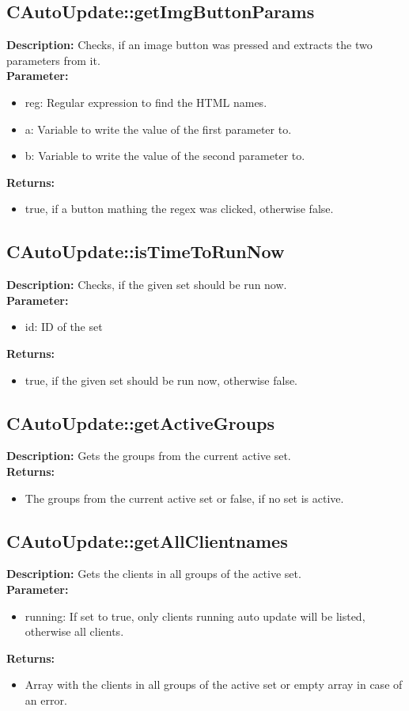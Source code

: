 \subsection{CAutoUpdate::getImgButtonParams}
\textbf{Description:} Checks, if an image button was pressed and extracts the two parameters from it.\\
\textbf{Parameter:}
\begin{itemize}
\item reg: Regular expression to find the HTML names.
\item a: Variable to write the value of the first parameter to.
\item b: Variable to write the value of the second parameter to.
\end{itemize}
\textbf{Returns:}
\begin{itemize}
\item true, if a button mathing the regex was clicked, otherwise false.
\end{itemize}

\subsection{CAutoUpdate::isTimeToRunNow}
\textbf{Description:} Checks, if the given set should be run now.\\
\textbf{Parameter:}
\begin{itemize}
\item id: ID of the set
\end{itemize}
\textbf{Returns:}
\begin{itemize}
\item true, if the given set should be run now, otherwise false.
\end{itemize}

\subsection{CAutoUpdate::getActiveGroups}
\textbf{Description:} Gets the groups from the current active set.\\
\textbf{Returns:}
\begin{itemize}
\item The groups from the current active set or false, if no set is active.
\end{itemize}

\subsection{CAutoUpdate::getAllClientnames}
\textbf{Description:} Gets the clients in all groups of the active set.\\
\textbf{Parameter:}
\begin{itemize}
\item running: If set to true, only clients running auto update will be listed, otherwise all clients.
\end{itemize}
\textbf{Returns:}
\begin{itemize}
\item Array with the clients in all groups of the active set or empty array in case of an error.
\end{itemize}

